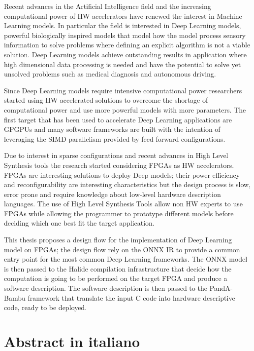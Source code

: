\documentclass[11pt, a4paper, twoside, openright]{report}
\begin{document}
Recent advances in the Artificial Intelligence field and the increasing computational power of HW accelerators have renewed the interest in Machine Learning models.
In particular the field is interested in Deep Learning models, powerful biologically inspired models that model how the model process sensory information to solve problems where defining an explicit algorithm is not a viable solution. 
Deep Learning models achieve outstanding results in application where high dimensional data processing is needed and have the potential to solve yet unsolved problems such as medical diagnosis and autonomous driving.

Since Deep Learning models require intensive computational power researchers started using HW accelerated solutions to overcome the shortage of computational power and use more powerful models with more parameters.
The first target that has been used to accelerate Deep Learning applications are GPGPUs and many software frameworks are built with the intention of leveraging the SIMD parallelism provided by feed forward configurations.

Due to interest in sparse configurations and recent advances in High Level Synthesis tools the research started considering FPGAs as HW accelerators. 
FPGAs are interesting solutions to deploy Deep models; their power efficiency and reconfigurability are interesting characteristics but the design process is slow, error prone and require knowledge about low-level hardware description languages.
The use of High Level Synthesis Tools allow non HW experts to use FPGAs while allowing the programmer to prototype different models before deciding which one best fit the target application.

This thesis proposes a design flow for the implementation of Deep Learning model on FPGAs; the design flow rely on the ONNX IR to provide a common entry point for the most common Deep Learning frameworks.
The ONNX model is then passed to the Halide compilation infrastructure that decide how the computation is going to be performed on the target FPGA and produce a software description.
The software description is then passed to the PandA-Bambu framework \cite{PandA-Bambu} that translate the input C code into hardware descriptive code, ready to be deployed.
\newpage

\section*{Abstract in italiano}
\end{document}
